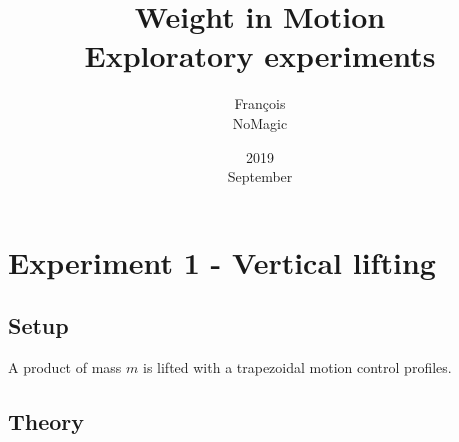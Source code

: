 \documentclass[a4paper,11pt]{article}
\title{Weight in Motion \\ Exploratory experiments}
\date{2019\\ September}
\author{François\\ NoMagic}
\begin{document}

\maketitle

\section{Experiment 1 - Vertical lifting}

\subsection{Setup}

A product of mass \(m\) is lifted with a trapezoidal motion control profiles.
\subsection{Theory}
\end{document}
